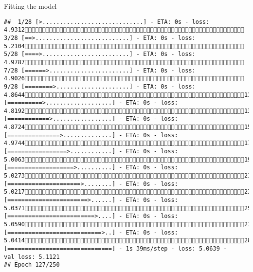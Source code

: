 \documentclass[
  ignorenonframetext,
]{beamer}
\begin{document}
\begin{frame}[fragile]{Fitting the model}
\begin{verbatim}
##  1/28 [>.............................] - ETA: 0s - loss: 4.9312 3/28 [==>...........................] - ETA: 0s - loss: 5.2104 5/28 [====>.........................] - ETA: 0s - loss: 4.9787 7/28 [======>.......................] - ETA: 0s - loss: 4.9026 9/28 [========>.....................] - ETA: 0s - loss: 4.864411/28 [==========>...................] - ETA: 0s - loss: 4.819213/28 [============>.................] - ETA: 0s - loss: 4.872415/28 [===============>..............] - ETA: 0s - loss: 4.974417/28 [=================>............] - ETA: 0s - loss: 5.006319/28 [===================>..........] - ETA: 0s - loss: 5.027321/28 [=====================>........] - ETA: 0s - loss: 5.021723/28 [=======================>......] - ETA: 0s - loss: 5.037125/28 [=========================>....] - ETA: 0s - loss: 5.059027/28 [===========================>..] - ETA: 0s - loss: 5.041428/28 [==============================] - 1s 39ms/step - loss: 5.0639 - val_loss: 5.1121
## Epoch 127/250

\end{verbatim}
\end{frame}
\end{document}
